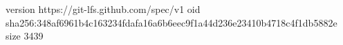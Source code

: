 version https://git-lfs.github.com/spec/v1
oid sha256:348af6961b4c163234fdafa16a6b6eec9f1a44d236e23410b4718c4f1db5882e
size 3439

